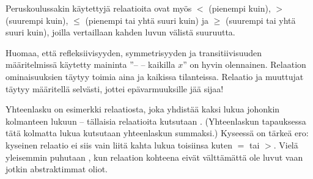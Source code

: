 Peruskoulussakin käytettyjä relaatioita ovat myös $<$ (pienempi kuin), $>$ (suurempi kuin), $\leq$ (pienempi tai yhtä suuri kuin) ja $\geq$ (suurempi tai yhtä suuri kuin), joilla vertaillaan kahden luvun välistä suuruutta.

\begin{esimerkki}
\end{esimerkki}

Huomaa, että refleksiivisyyden, symmetrisyyden ja transitiivisuuden määritelmissä käytetty maininta ''-- -- kaikilla $x$'' on hyvin olennainen. Relaation ominaisuuksien täytyy toimia aina ja kaikissa tilanteissa. Relaatio ja muuttujat täytyy määritellä selvästi, jottei epävarmuuksille jää sijaa!

Yhteenlasku on esimerkki relaatiosta, joka yhdistää kaksi lukua johonkin kolmanteen lukuun -- tällaisia relaatioita kutsutaan . (Yhteenlaskun tapauksessa tätä kolmatta lukua kutsutaan yhteenlaskun summaksi.) Kyseessä on tärkeä ero: kyseinen relaatio ei siis vain liitä kahta lukua toisiinsa kuten $=$ tai $>$. Vielä yleisemmin puhutaan , kun relaation kohteena eivät välttämättä ole luvut vaan jotkin abstraktimmat oliot.
